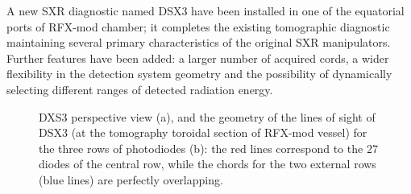 A new SXR diagnostic named DSX3 have been installed in one of the equatorial ports of RFX-mod chamber; it completes the existing tomographic diagnostic maintaining several primary characteristics of the original SXR manipulators. Further
features have been added: a larger number of acquired cords, a wider flexibility in the detection system geometry and the possibility of dynamically selecting different ranges of detected radiation energy.
%
\begin{figure}
    \centering
    \caption{DXS3 perspective view (a), and the geometry of the lines of sight of DSX3 (at the tomography toroidal section
             of RFX-mod vessel) for the three rows of photodiodes (b): the red lines correspond to the
             27 diodes of the central row, while the chords for the two external rows (blue lines) are perfectly
             overlapping. }
    \label{fig:DSX3_sketch}
\end{figure}




